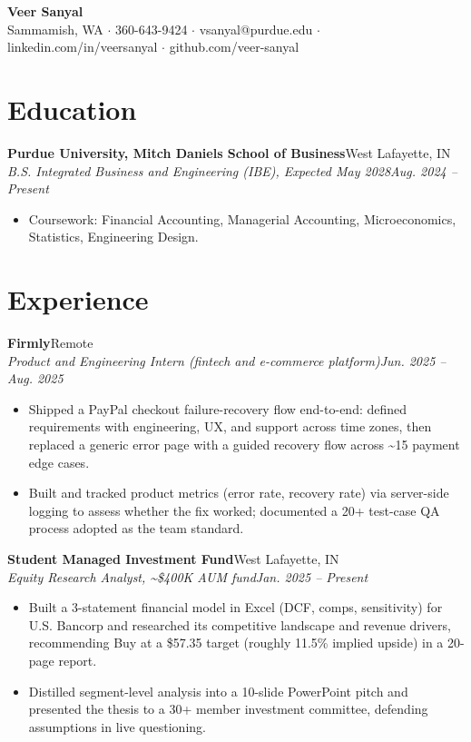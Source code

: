 \documentclass[10pt,letterpaper]{article}
\newcommand{\entry}[4]{%
  \textbf{#1}\hfill #2\\[1pt]
  \textit{#3}\hfill \textit{#4}\\[2pt]
}
\begin{document}
\begin{center}
  {\LARGE \textbf{Veer Sanyal}}\\[3pt]
  Sammamish, WA $\cdot$ 360-643-9424 $\cdot$ vsanyal@purdue.edu $\cdot$ linkedin.com/in/veersanyal $\cdot$ github.com/veer-sanyal
\end{center}

\section*{Education}
\textbf{Purdue University, Mitch Daniels School of Business}\hfill West Lafayette, IN\\[1pt]
\textit{B.S. Integrated Business and Engineering (IBE), Expected May 2028}\hfill \textit{Aug. 2024 -- Present}
\begin{itemize}
  \item Coursework: Financial Accounting, Managerial Accounting, Microeconomics, Statistics, Engineering Design.
\end{itemize}

\section*{Experience}
\entry{Firmly}{Remote}{Product and Engineering Intern (fintech and e-commerce platform)}{Jun. 2025 -- Aug. 2025}
\begin{itemize}
  \item Shipped a PayPal checkout failure-recovery flow end-to-end: defined requirements with engineering, UX, and support across time zones, then replaced a generic error page with a guided recovery flow across \textasciitilde15 payment edge cases.
  \item Built and tracked product metrics (error rate, recovery rate) via server-side logging to assess whether the fix worked; documented a 20+ test-case QA process adopted as the team standard.
\end{itemize}

\entry{Student Managed Investment Fund}{West Lafayette, IN}{Equity Research Analyst, \textasciitilde\$400K AUM fund}{Jan. 2025 -- Present}
\begin{itemize}
  \item Built a 3-statement financial model in Excel (DCF, comps, sensitivity) for U.S. Bancorp and researched its competitive landscape and revenue drivers, recommending Buy at a \$57.35 target (roughly 11.5\% implied upside) in a 20-page report.
  \item Distilled segment-level analysis into a 10-slide PowerPoint pitch and presented the thesis to a 30+ member investment committee, defending assumptions in live questioning.
\end{itemize}
\end{document}
